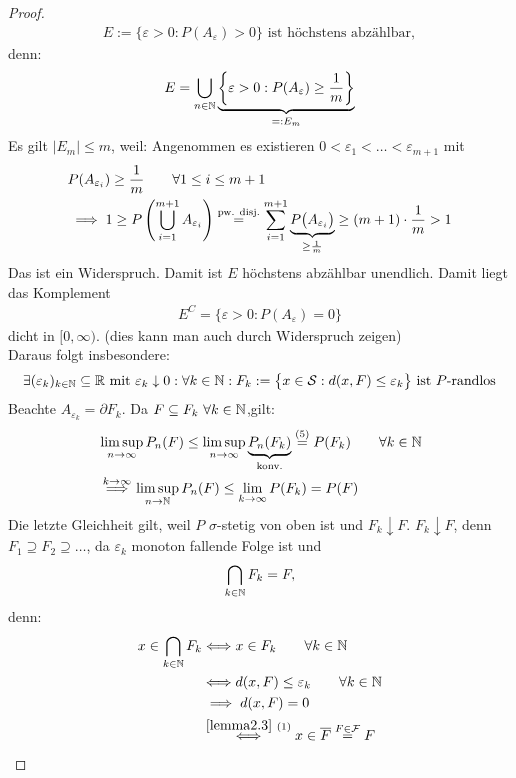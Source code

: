 \begin{proof}
\begin{align}\label{eqProof1.4.2DoppelSternchenUnten}
E:=\big\lbrace\varepsilon>0:P(A_\varepsilon)>0\big\rbrace\text{ ist höchstens abzählbar},
\end{align}
denn:
\begin{align*}
E=\bigcup\limits_{n\in\mathbb{N}}\underbrace{\left\lbrace\varepsilon>0:P(A_\varepsilon)\geq\frac{1}{m}\right\rbrace}_{=:E_m}
\end{align*}
Es gilt $|E_m|\leq m$, weil: Angenommen es existieren $0<\varepsilon_1<\ldots<\varepsilon_{m+1}$ mit 
\begin{align*}
&P(A_{\varepsilon_i})\geq\frac{1}{m}\qquad\forall 1\leq i\leq m+1\\
&\implies
1\geq P\left(\bigcup\limits_{i=1}^{m+1} A_{\varepsilon_i}\right)
\stackrel{\text{pw. disj.}}{=}
\sum\limits_{i=1}^{m+1}\underbrace{P\big(A_{\varepsilon_i}\big)}_{\geq\frac{1}{m}}\geq(m+1)\cdot\frac{1}{m}>1
\end{align*}
Das ist ein Widerspruch. Damit ist $E$ höchstens abzählbar unendlich. Damit liegt das Komplement
\begin{align*}
E^C=\big\lbrace\varepsilon>0: P(A_\varepsilon)=0\big\rbrace
\end{align*}
dicht in $[0,\infty)$. (dies kann man auch durch Widerspruch zeigen)\\
Daraus folgt insbesondere:
\begin{align*}
\exists(\varepsilon_k)_{k\in\mathbb{N}}\subseteq\mathbb{R}\text{ mit }\varepsilon_k\downarrow0:\forall	 k\in\mathbb{N}: F_k:=\big\lbrace x\in\mathcal{S}:d(x,F)\leq\varepsilon_k\big\rbrace\text{ ist $P$-randlos}
\end{align*}
Beachte $A_{\varepsilon_k}=\partial F_k$. Da $F\subseteq F_k~\forall k\in\mathbb{N}$,gilt:
\begin{align*}
&\limsup\limits_{n\to\infty} P_n(F)
\leq\limsup\limits_{n\to\infty} \underbrace{P_n(F_k)}_{\text{konv.}}
\stackrel{(5)}{=}
P(F_k)\qquad\forall k\in\mathbb{N}\\
&\stackrel{k\to\infty}{\implies}
\limsup\limits_{n\to\mathbb{N}} P_n(F)
\leq\lim\limits_{k\to\infty} P(F_k)
=P(F)
\end{align*}
Die letzte Gleichheit gilt, weil $P$ $\sigma$-stetig von oben ist und $F_k\downarrow F$. $F_k\downarrow F$, denn $F_1\supseteq F_2\supseteq\ldots$, da $\varepsilon_k$ monoton fallende Folge ist und
\begin{align*}
\bigcap\limits_{k\in\mathbb{N}}F_k=F, 
\end{align*}
denn: 
\begin{align*}
x\in\bigcap\limits_{k\in\mathbb{N}}F_k
&\Longleftrightarrow
x\in F_k\qquad\forall k\in\mathbb{N}\\
&\Longleftrightarrow
d(x,F)\leq\varepsilon_k\qquad\forall k\in\mathbb{N}\\
&\implies
d(x,F)=0\\
&\stackrel{\ref{lemma2.3}~(1)}{\Longleftrightarrow}
x\in \overline{F}\stackrel{F\in\mathcal{F}}{=}F
\end{align*}
\end{proof}

